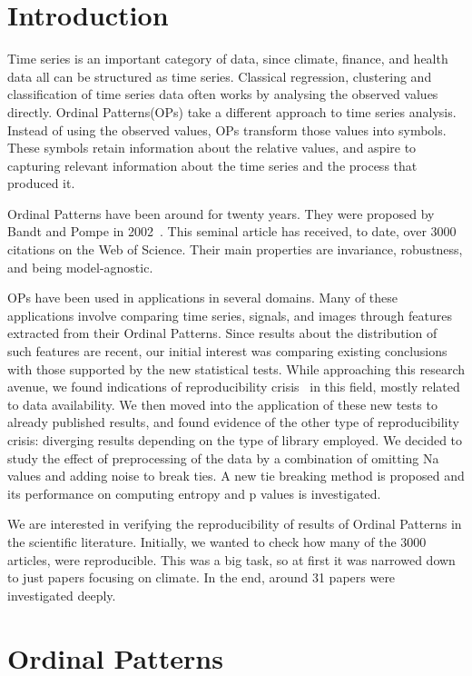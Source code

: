 
\chapter{Introduction}

Time series is an important category of data, since climate, finance, and health data all can be structured as time series. Classical regression, clustering and classification of time series data often works by analysing the observed values directly. Ordinal Patterns(OPs) take a different approach to time series analysis.
Instead of using the observed values, OPs transform those values into symbols.
These symbols retain information about the relative values, and aspire to capturing relevant information about the time series and the process that produced it.

Ordinal Patterns have been around for twenty years.
They were proposed by Bandt and Pompe in 2002~\cite{Bandt2002}.
This seminal article has received, to date, over \num{3000} citations on the Web of Science.
Their main properties are invariance, robustness, and being model-agnostic.

OPs have been used in applications in several domains.
Many of these applications involve comparing time series, signals, and images through features extracted from their Ordinal Patterns.
Since results about the distribution of such features are recent, our initial interest was comparing existing conclusions with those supported by the new statistical tests.
While approaching this research avenue, we found indications of reproducibility crisis~\cite{Fidler2018} in this field, mostly related to data availability.
We then moved into the application of these new tests to already published results, and found evidence of the other type of reproducibility crisis: diverging results depending on the type of library employed.
We decided to study the effect of preprocessing of the data by a combination of omitting Na values and adding noise to break ties. A new tie breaking method is proposed and its performance on computing entropy and p values is investigated.

We are interested in verifying the reproducibility of results of Ordinal Patterns in the scientific literature.
Initially, we wanted to check how many of the 3000 articles, were reproducible. This was a big task, so at first it was narrowed down to just papers focusing on climate. In the end, around 31 papers were investigated deeply.

\chapter{Ordinal Patterns}

